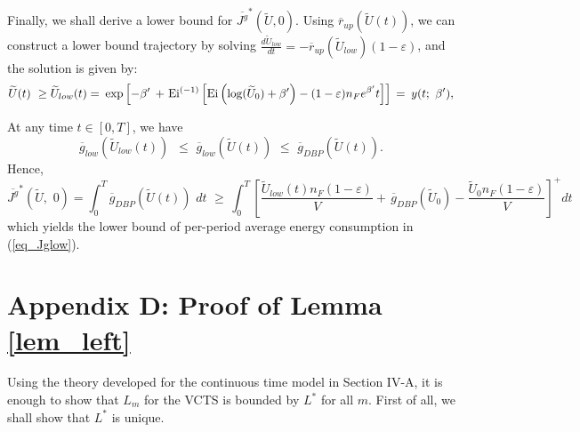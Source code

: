 \documentclass[11pt,journal, onecolumn]{./IEEEtran}
\newcommand{\red}{\color{black}}
\begin{document}
{\red Finally, we shall derive a lower bound for $\overline {J^g}^*(\widetilde U,0)$.} Using $\overline r_{up}(\widetilde U(t))$, we can construct a lower bound trajectory by solving $\frac{d\widetilde U_{low}}{dt} = -\overline r_{up}(\widetilde U_{low})(1-\varepsilon)$,
and the solution is given by:
\begin{equation}\label{eq_ulow}
\widetilde U(t)\,\, \ge {\widetilde U_{low}}(t) = {\mkern 1mu} \exp \left[ { - {\beta '}{\kern 1pt} {\kern 1pt}  + {\kern 1pt} {\rm{E}}{{\rm{i}}^{( - 1)}}\left[ {{\rm{Ei}}\left( {\log ({{\widetilde U}_0}) + {\beta '}} \right) -  (1 - {\varepsilon}){n_F}{e^{{\beta '}}}t} \right]} \right]\, = \,{\mkern 1mu} y(t;\,\,\beta '),
\end{equation}

At any time $t \in[0,T]$, we have
\begin{equation}\label{eq_glows}
{\overline g _{low}}({\widetilde U_{low}}(t))\,\,\, \le \,\,{\overline g _{low}}(\widetilde U(t))\,\, \le \,\,{\overline g _{DBP}}(\widetilde U(t)).
\end{equation}
Hence,
\[{\overline {{J^g}} ^*}(\widetilde U,\,\,0) = \int_0^T {{{\overline g }_{DBP}}(\widetilde U(t))\,\,} dt\,\, \ge \,\int_0^T {{{\left[ {\frac{{{{\widetilde U}_{low}}(t){n_F}(1 - {\varepsilon})}}{V} + \,{{\overline g }_{DBP}}({{\widetilde U}_0}) - \frac{{\widetilde U_0 {n_F}(1 - {\varepsilon})}}{V}} \right]}^ + }dt} \]
which yields the lower bound of per-period average energy consumption in (\ref{eq_Jglow}).


\section*{Appendix D: Proof of Lemma \ref{lem_left}}\label{app_left}
{\red Using the theory developed for the continuous time model in Section IV-A, it is enough to show that $L_m$ for the VCTS is bounded by $L^*$ for all $m$. First of all, we shall show that $L^*$ is unique.}
\end{document}
